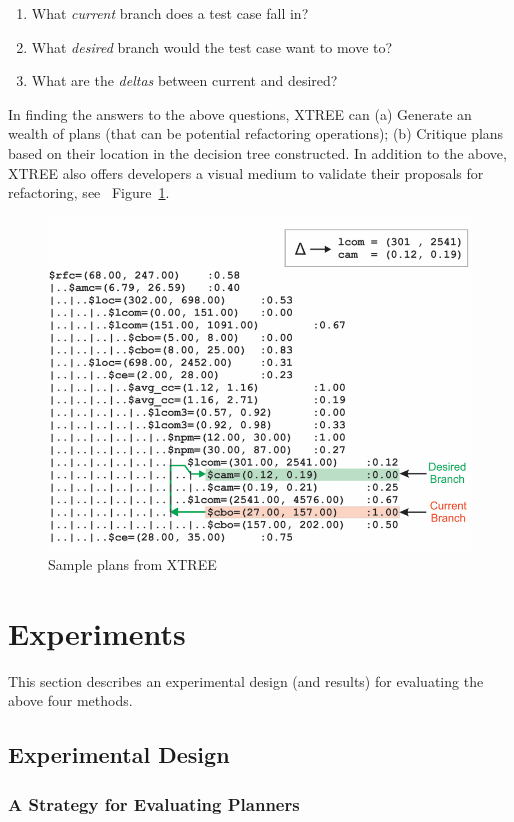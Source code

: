 \documentclass{sig-alternate}
\newcommand{\be}{\begin{enumerate}}
\newcommand{\ee}{\end{enumerate}}
\newcommand{\fig}[1]{Figure~\ref{fig:#1}}
\begin{document}
\be
\item What {\em current} branch does a test case fall in?
\item What {\em desired} branch would the test case want to move to?
\item What are the {\em deltas} between current and desired? 
\ee

In finding the answers to the above questions, XTREE can (a) Generate an wealth of plans (that can be potential refactoring operations); (b) Critique plans based on their location in the decision tree constructed. In addition to the above, XTREE also offers developers a visual medium to validate their proposals for refactoring, see ~\fig{xtree_samp}.

\begin{figure}[btp!]
\centering
\includegraphics[width=\linewidth]{figs/XTREE_samp.png}
\caption{Sample plans from XTREE}\label{fig:xtree_samp}
\end{figure}


\section{Experiments}

This section describes an experimental design (and results) for evaluating the above four methods. 
\subsection{Experimental Design}

\subsubsection{A Strategy for Evaluating Planners}
 
\end{document}
